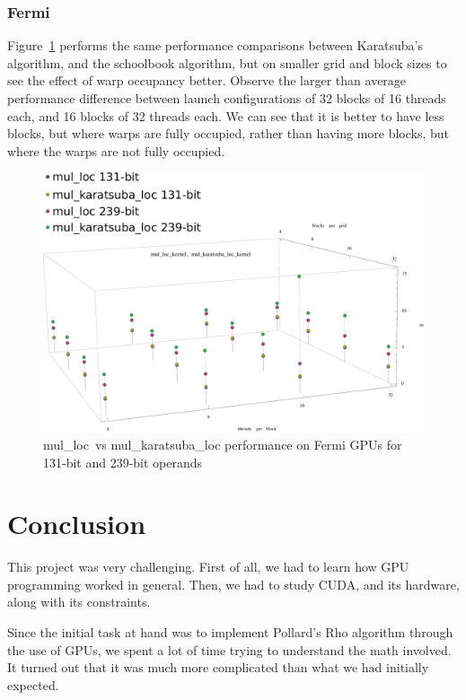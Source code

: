 \documentclass[12pt, a4paper]{report}
\begin{document}
\subsection{Fermi}
Figure~\ref{fig:mul_loc_vs_mul_karatsuba_loc_fermi_131_vs_239_duration} performs the same
performance comparisons between Karatsuba's algorithm, and the schoolbook algorithm, but on smaller
grid and block sizes to see the effect of warp occupancy better.
Observe the larger than average performance difference between launch configurations
of 32 blocks of 16 threads each, and 16 blocks of 32 threads each.
We can see that it is better to have less blocks, but where warps are fully occupied, rather than having more blocks, but where the warps are not fully occupied.
\begin{figure}[h]
\centering
\includegraphics[scale=0.5]{figs/mul_loc_vs_mul_karatsuba_loc_fermi_131_vs_239_duration}
\caption{mul\_loc\ vs mul\_karatsuba\_loc performance on Fermi GPUs for 131-bit and 239-bit operands}
\label{fig:mul_loc_vs_mul_karatsuba_loc_fermi_131_vs_239_duration}
\end{figure}

\chapter{Conclusion}
This project was very challenging.
First of all, we had to learn how GPU programming worked in general.
Then, we had to study CUDA, and its hardware, along with its constraints.

Since the initial task at hand was to implement Pollard's Rho algorithm through the use of
GPUs, we spent a lot of time trying to understand the math involved.
It turned out that it was much more complicated than what we had initially expected.
\end{document}
